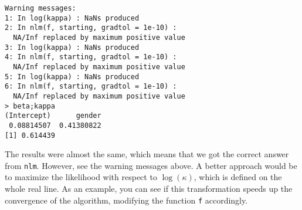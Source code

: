 \begin{enumerate}[(i)]
\begin{spacing}{1.2}
\begin{footnotesize}
\begin{verbatim}
Warning messages:
1: In log(kappa) : NaNs produced
2: In nlm(f, starting, gradtol = 1e-10) :
  NA/Inf replaced by maximum positive value
3: In log(kappa) : NaNs produced
4: In nlm(f, starting, gradtol = 1e-10) :
  NA/Inf replaced by maximum positive value
5: In log(kappa) : NaNs produced
6: In nlm(f, starting, gradtol = 1e-10) :
  NA/Inf replaced by maximum positive value
> beta;kappa
(Intercept)      gender 
 0.08814507  0.41380822 
[1] 0.614439
\end{verbatim}
\end{footnotesize}
\end{spacing}   
The results were almost the same, which means that we got the correct answer from \verb|nlm|. However, see the warning messages above. A better approach would be to maximize the likelihood with respect to $\log(\kappa)$, which is defined on the whole real line. As an example, you can see if this transformation speeds up the convergence of the algorithm, modifying the function \verb|f| accordingly.  


\end{enumerate}

 